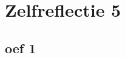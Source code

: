 \documentclass[lineaire_algebra_oplossingen.tex]{subfiles}
\begin{document}
\section{Zelfreflectie 5}
\subsection{oef 1}
\end{document}
